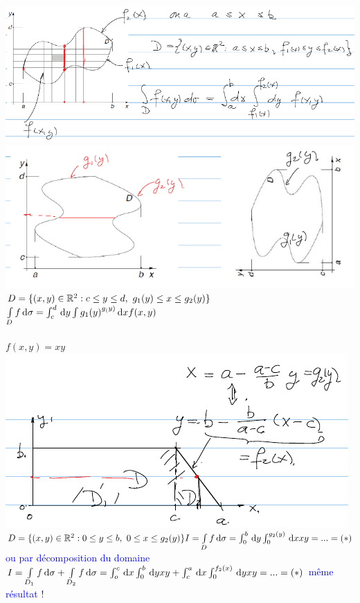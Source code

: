 \documentclass[12pt,a4paper]{article}
\begin{document}
\includegraphics[scale=0.7]{images/integ_double_patate}\\
\includegraphics[scale=0.7]{images/renversement_patate}\\
$D = \{(x,y) \in \R^2 : c \leq y \leq d,\ g_1(y) \leq x \leq g_2(y)\}$\\
$\int\limits_D f \, \mathrm d \sigma = \int_c^d \, \mathrm d y \int{g_1(y)}^{g_(y)} \, \mathrm d x f(x,y)$\\
\\
$f(x,y) = xy$ \includegraphics[scale=0.7]{images/pente}\\
$D = \{(x,y) \in \mathbb{R}^2 : 0 \leq y \leq b,\ 0 \leq x \leq g_2(y)\}\\
I = \int\limits_D f \, \mathrm d \sigma = \int_0^b \, \mathrm d y \int_{0}^{g_2(y)}  \, \mathrm d x xy = ... = (*)$\\
\textcolor{blue}{ou par décomposition du domaine \\
$I = \int\limits_{D_1} f \, \mathrm d \sigma + \int\limits_{D_2} f \, \mathrm d \sigma = \int_{o}^{c}  \, \mathrm d x \int_0^b \, \mathrm d y xy + \int_{c}^{a}  \, \mathrm d x\int_0^{f_2(x)} \, \mathrm d y xy = ... = (*)$ même résultat !}\\
\end{document}

